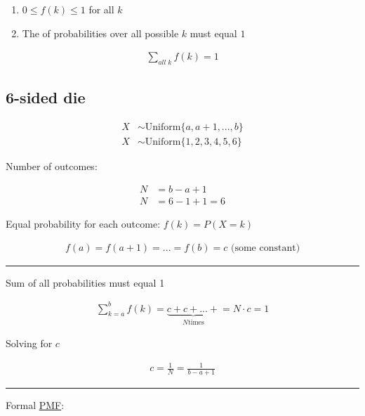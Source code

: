 \documentclass[
  a4paper,
]{scrbook}
\providecommand{\tightlist}{%
  \setlength{\itemsep}{0pt}\setlength{\parskip}{0pt}}\usepackage{longtable,booktabs,array}
\begin{document}
\begin{enumerate}
\def\labelenumi{\arabic{enumi}.}
\tightlist
\item
  \(0 \leq f(k) \leq 1\) for all \(k\)
\item
  The of probabilities over all possible \(k\) must equal \(1\)
\end{enumerate}

\begin{align}
\sum_{all \; k}f(k) = 1
\end{align}

\subsection{6-sided die}\label{sided-die}

\begin{align}
X &\sim \mathrm{Uniform}\{a,a+1, ..., b\} \\
X &\sim \mathrm{Uniform}\{1,2,3,4,5,6\}
\end{align}

Number of outcomes:

\begin{align}
N &= b-a+1\\
N &= 6-1+1=6
\end{align}

Equal probability for each outcome: \(f(k) = P (X = k)\)

\begin{align}
f(a) = f(a+1)= ... = f(b) = c \text{ (some constant)}
\end{align}

\begin{center}\rule{0.5\linewidth}{0.5pt}\end{center}

Sum of all probabilities must equal 1

\begin{align}
\sum_{k = a}^b f(k) = \underbrace{c+c+ ... +}_{N\text{times}} = N \cdot c = 1
\end{align}

Solving for \(c\)

\begin{align}
c = \frac{1}{N} = \frac{1}{b-a+1}
\end{align}

\begin{center}\rule{0.5\linewidth}{0.5pt}\end{center}

Formal \hyperref[acronyms_PMF]{PMF}:
\end{document}
